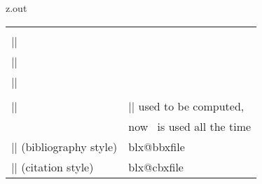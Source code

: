 \begin{VerbatimOut}{z.out}
\begin{inlinetable}
\begin{tabular}{@{}ll@{}}
    \noalign{\vspace*{12pt}}
    \multicolumn{2}{@{}l}{DERIVED (for debugging)\hfil}\\
    |\ZZinscam|& \ZZinscam\\
    |\ZZinscampro|& \ZZinscampro\\
    |\ZZinscamprodeg|& \ZZinscamprodeg\\
    \noalign{\vspace*{12pt}}
    \multicolumn{2}{@{}l}{COMPUTED\hfil}\\
    |\ZZBibProcessor|& |\ZZBibProcessor| used to be computed,\\
    &                  now \BibLaTeXLogo\ is used all the time\\
    |\blx@bbxfile| (bibliography style)& \csname blx@bbxfile\endcsname\\
    |\blx@cbxfile| (citation style)&  \csname blx@cbxfile\endcsname\\
    \bottomrule
  \end{tabular}
\end{inlinetable}
\end{VerbatimOut}

\MyIO

